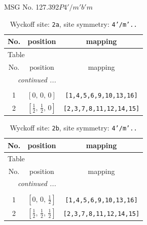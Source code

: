 \documentclass[fleqn,8pt]{jsarticle}
\begin{document}
\setcounter{MaxMatrixCols}{32}

\renewcommand{\tablename}{Table~}
\renewcommand{\figurename}{Figure~}
\begin{center}
\LARGE
MSG No. 127.392\quad$P4'/m'b'm$
\end{center}
\renewcommand{\arraystretch}{1.2}
\begin{longtable}{ccc}
\caption{Wyckoff site: {\tt 2a}, site symmetry: {\tt 4'/m'..}}
 \\
 \hline \hline
No. & position & mapping \\ \hline \endfirsthead

\multicolumn{2}{l}{\tablename\ \thetable{}} \\
 \hline \hline
No. & position & mapping \\ \hline \endhead

 \hline \hline
\multicolumn{2}{r}{\footnotesize\it continued ...} \\ \endfoot

 \hline \hline
\multicolumn{2}{r}{} \\ \endlastfoot

1 & $\left[ 0,\, 0,\, 0 \right]$ & {\tt [1,4,5,6,9,10,13,16]} \\ \hline
2 & $\left[ \frac{1}{2},\, \frac{1}{2},\, 0 \right]$ & {\tt [2,3,7,8,11,12,14,15]} \\
\end{longtable}
\renewcommand{\arraystretch}{1.2}
\begin{longtable}{ccc}
\caption{Wyckoff site: {\tt 2b}, site symmetry: {\tt 4'/m'..}}
 \\
 \hline \hline
No. & position & mapping \\ \hline \endfirsthead

\multicolumn{2}{l}{\tablename\ \thetable{}} \\
 \hline \hline
No. & position & mapping \\ \hline \endhead

 \hline \hline
\multicolumn{2}{r}{\footnotesize\it continued ...} \\ \endfoot

 \hline \hline
\multicolumn{2}{r}{} \\ \endlastfoot

1 & $\left[ 0,\, 0,\, \frac{1}{2} \right]$ & {\tt [1,4,5,6,9,10,13,16]} \\ \hline
2 & $\left[ \frac{1}{2},\, \frac{1}{2},\, \frac{1}{2} \right]$ & {\tt [2,3,7,8,11,12,14,15]} \\
\end{longtable}
\end{document}
